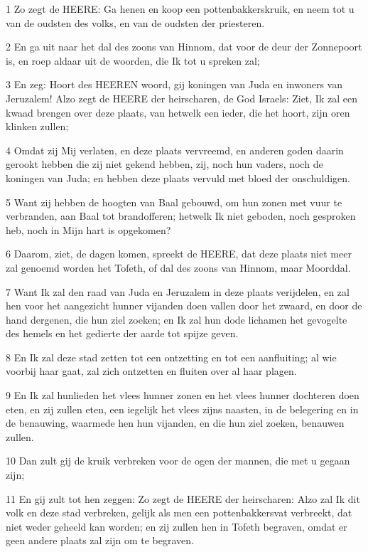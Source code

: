 \par 1 Zo zegt de HEERE: Ga henen en koop een pottenbakkerskruik, en neem tot u van de oudsten des volks, en van de oudsten der priesteren.
\par 2 En ga uit naar het dal des zoons van Hinnom, dat voor de deur der Zonnepoort is, en roep aldaar uit de woorden, die Ik tot u spreken zal;
\par 3 En zeg: Hoort des HEEREN woord, gij koningen van Juda en inwoners van Jeruzalem! Alzo zegt de HEERE der heirscharen, de God Israels: Ziet, Ik zal een kwaad brengen over deze plaats, van hetwelk een ieder, die het hoort, zijn oren klinken zullen;
\par 4 Omdat zij Mij verlaten, en deze plaats vervreemd, en anderen goden daarin gerookt hebben die zij niet gekend hebben, zij, noch hun vaders, noch de koningen van Juda; en hebben deze plaats vervuld met bloed der onschuldigen.
\par 5 Want zij hebben de hoogten van Baal gebouwd, om hun zonen met vuur te verbranden, aan Baal tot brandofferen; hetwelk Ik niet geboden, noch gesproken heb, noch in Mijn hart is opgekomen?
\par 6 Daarom, ziet, de dagen komen, spreekt de HEERE, dat deze plaats niet meer zal genoemd worden het Tofeth, of dal des zoons van Hinnom, maar Moorddal.
\par 7 Want Ik zal den raad van Juda en Jeruzalem in deze plaats verijdelen, en zal hen voor het aangezicht hunner vijanden doen vallen door het zwaard, en door de hand dergenen, die hun ziel zoeken; en Ik zal hun dode lichamen het gevogelte des hemels en het gedierte der aarde tot spijze geven.
\par 8 En Ik zal deze stad zetten tot een ontzetting en tot een aanfluiting; al wie voorbij haar gaat, zal zich ontzetten en fluiten over al haar plagen.
\par 9 En Ik zal hunlieden het vlees hunner zonen en het vlees hunner dochteren doen eten, en zij zullen eten, een iegelijk het vlees zijns naasten, in de belegering en in de benauwing, waarmede hen hun vijanden, en die hun ziel zoeken, benauwen zullen.
\par 10 Dan zult gij de kruik verbreken voor de ogen der mannen, die met u gegaan zijn;
\par 11 En gij zult tot hen zeggen: Zo zegt de HEERE der heirscharen: Alzo zal Ik dit volk en deze stad verbreken, gelijk als men een pottenbakkersvat verbreekt, dat niet weder geheeld kan worden; en zij zullen hen in Tofeth begraven, omdat er geen andere plaats zal zijn om te begraven.
